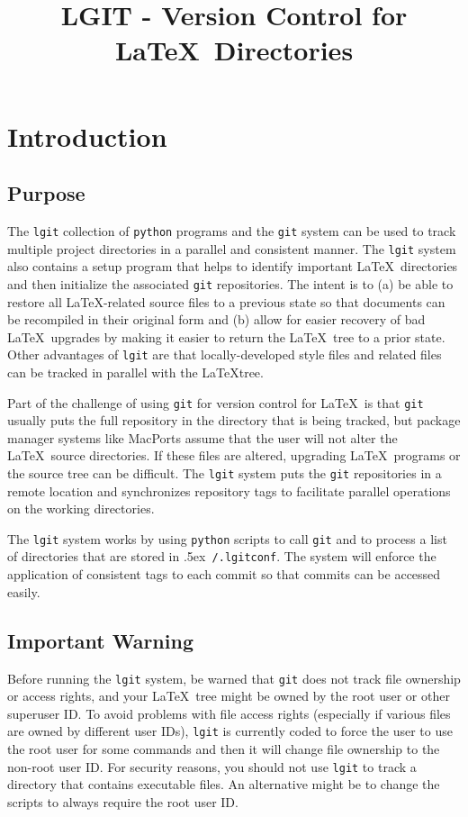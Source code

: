 \documentclass{ltxdoc}
\title{LGIT - Version Control for \LaTeX\ Directories}
\def\bobtilde{\lower.5ex\hbox{\tt \string~}}%
\def\ucmd#1{{\tt {#1}}}
\def\lgitconf{\bobtilde\ucmd{/.lgitconf}}
\begin{document}
\maketitle
\tableofcontents
\newpage
\section{Introduction}
\subsection{Purpose}
The \ucmd{lgit} collection of \ucmd{python} programs and the \ucmd{git} system can be used to track multiple project directories in a parallel and consistent manner.  The \ucmd{lgit} system also contains a setup program that helps to identify important \LaTeX\ directories and then initialize the associated \ucmd{git} repositories.  The intent is to (a) be able to restore all \LaTeX-related source files to a previous state so that documents can be recompiled in their original form and (b) allow for easier recovery of bad \LaTeX\ upgrades by making it easier to return the \LaTeX\ tree to a prior state.  Other advantages of \ucmd{lgit} are that locally-developed style files and related files can be tracked in parallel with the \LaTeX tree.

Part of the challenge of using \ucmd{git} for version control for \LaTeX\ is that \ucmd{git} usually puts the full repository in the directory that is being tracked, but package manager systems like MacPorts assume that the user will not alter the \LaTeX\ source directories. If these files are altered, upgrading \LaTeX\ programs or the source tree can be difficult. The \ucmd{lgit} system puts the \ucmd{git} repositories in a remote location and synchronizes repository tags to facilitate parallel operations on the working directories.

The \ucmd{lgit} system works by using \ucmd{python} scripts to call \ucmd{git} and to process a list of directories that are stored in \lgitconf.  The system will enforce the application of consistent tags to each commit so that commits can be accessed easily.

\subsection{Important Warning}
Before running the \ucmd{lgit} system, be warned that \ucmd{git} does not track file ownership or access rights, and your \LaTeX\ tree might be owned by the root user or other superuser ID.  To avoid problems with file access rights (especially if various files are owned by different user IDs), \ucmd{lgit} is currently coded to force the user to use the root user for some commands and then it will change file ownership to the non-root user ID.  For security reasons, you should not use \ucmd{lgit} to track a directory that contains executable files. An alternative might be to change the scripts to always require the root user ID.
\end{document}
